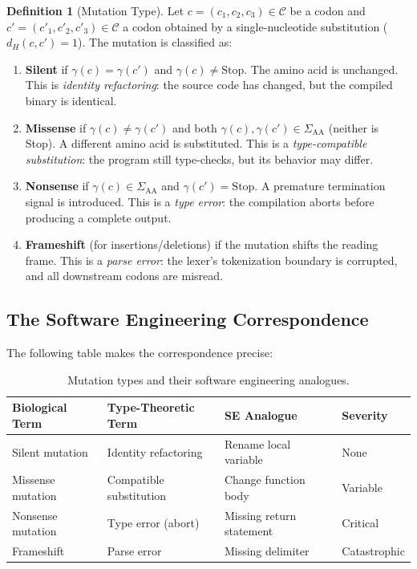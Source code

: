 \documentclass[12pt,a4paper]{article}
\theoremstyle{definition}
\newtheorem{definition}[theorem]{Definition}
\begin{document}
\begin{definition}[Mutation Type]\label{def:mutation-type}
Let $c = (c_1, c_2, c_3) \in \mathcal{C}$ be a codon and $c' = (c'_1, c'_2, c'_3) \in \mathcal{C}$ a codon obtained by a single-nucleotide substitution ($d_H(c, c') = 1$). The mutation is classified as:
\begin{enumerate}[label=(\roman*)]
  \item \textbf{Silent} if $\gamma(c) = \gamma(c')$ and $\gamma(c) \neq \text{Stop}$. The amino acid is unchanged. This is \emph{identity refactoring}: the source code has changed, but the compiled binary is identical.

  \item \textbf{Missense} if $\gamma(c) \neq \gamma(c')$ and both $\gamma(c), \gamma(c') \in \Sigma_\mathrm{AA}$ (neither is Stop). A different amino acid is substituted. This is a \emph{type-compatible substitution}: the program still type-checks, but its behavior may differ.

  \item \textbf{Nonsense} if $\gamma(c) \in \Sigma_\mathrm{AA}$ and $\gamma(c') = \text{Stop}$. A premature termination signal is introduced. This is a \emph{type error}: the compilation aborts before producing a complete output.

  \item \textbf{Frameshift} (for insertions/deletions) if the mutation shifts the reading frame. This is a \emph{parse error}: the lexer's tokenization boundary is corrupted, and all downstream codons are misread.
\end{enumerate}
\end{definition}

\subsection{The Software Engineering Correspondence}

The following table makes the correspondence precise:

\begin{table}[H]
\centering
\caption{Mutation types and their software engineering analogues.}
\label{tab:mutation-correspondence}
\begin{tabular}{llll}
\toprule
\textbf{Biological Term} & \textbf{Type-Theoretic Term} & \textbf{SE Analogue} & \textbf{Severity} \\
\midrule
Silent mutation     & Identity refactoring     & Rename local variable   & None \\
Missense mutation   & Compatible substitution  & Change function body    & Variable \\
Nonsense mutation   & Type error (abort)       & Missing return statement & Critical \\
Frameshift          & Parse error              & Missing delimiter       & Catastrophic \\
\bottomrule
\end{tabular}
\end{table}
\end{document}
